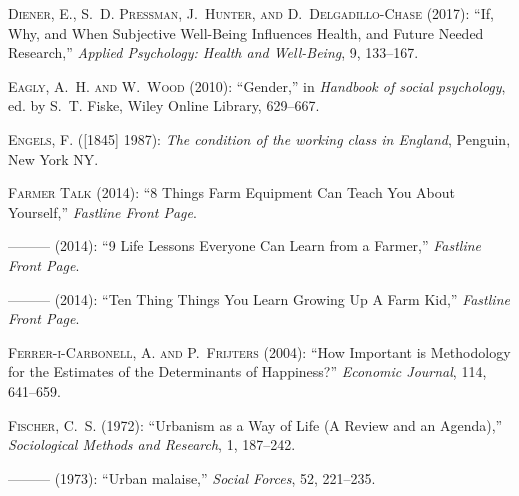 \documentclass[10pt, letterpaper]{article}
\begin{document}
\begin{spacing}{2.0}
\begin{thebibliography}{115}
\textsc{Diener, E., S.~D. Pressman, J.~Hunter, and D.~Delgadillo-Chase} (2017):
  \enquote{If, Why, and When Subjective Well-Being Influences Health, and
  Future Needed Research,} \emph{Applied Psychology: Health and Well-Being}, 9,
  133--167.

\textsc{Eagly, A.~H. and W.~Wood} (2010): \enquote{Gender,} in \emph{Handbook
  of social psychology}, ed. by S.~T. Fiske, Wiley Online Library, 629--667.

\textsc{Engels, F.} ([1845] 1987): \emph{The condition of the working class in
  England}, Penguin, New York NY.

\textsc{{Farmer Talk}} (2014{}): \enquote{8 Things Farm Equipment
  Can Teach You About Yourself,} \emph{Fastline Front Page}.

---\hspace{-.1pt}---\hspace{-.1pt}--- (2014{}): \enquote{9 Life
  Lessons Everyone Can Learn from a Farmer,} \emph{Fastline Front Page}.

---\hspace{-.1pt}---\hspace{-.1pt}--- (2014{}): \enquote{Ten Thing
  Things You Learn Growing Up A Farm Kid,} \emph{Fastline Front Page}.

\textsc{{Ferrer-i-Carbonell}, A. and P.~Frijters} (2004): \enquote{How
  Important is Methodology for the Estimates of the Determinants of Happiness?}
  \emph{Economic Journal}, 114, 641--659.

\textsc{Fischer, C.~S.} (1972): \enquote{Urbanism as a Way of Life (A Review
  and an Agenda),} \emph{Sociological Methods and Research}, 1, 187--242.

---\hspace{-.1pt}---\hspace{-.1pt}--- (1973): \enquote{Urban malaise,}
  \emph{Social Forces}, 52, 221--235.


\end{thebibliography}
\end{spacing}
\end{document}
